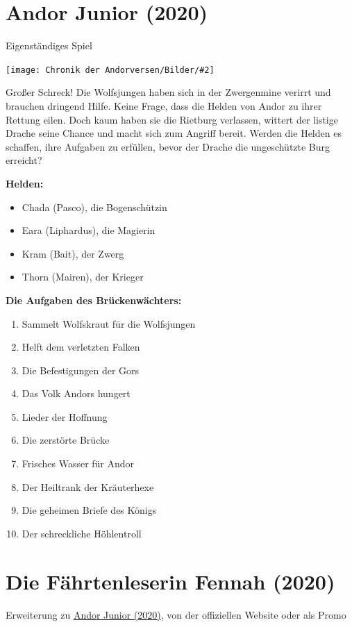 \documentclass[10pt, a4paper, oneside]{book}
\newcommand{\fillbreak}{\vspace*{\fill}\columnbreak}
\newcommand{\produkt}[1]{%
    \section{#1}%
    \label{Produkt: #1}%
}
\newcommand{\refprodukt}[1]{\hyperref[Produkt: #1]{#1}}
\newcommand{\bildmitts}[2][height=0.32\textwidth,width=0.48\textwidth,keepaspectratio]{%
    \begin{center}
        \texttt{[image: Chronik der Andorversen/Bilder/\#2]}
    \end{center}
}
\begin{document}
\begin{multicols}{2}
\fillbreak
\produkt{Andor Junior (2020)}

\begin{center}
    Eigenständiges Spiel
\end{center}


\bildmitts{Andor Junior (2020).png}

Großer Schreck! Die Wolfsjungen haben sich in der Zwergenmine verirrt und brauchen dringend Hilfe. Keine Frage, dass die Helden von Andor zu ihrer Rettung eilen. Doch kaum haben sie die Rietburg verlassen, wittert der listige Drache seine Chance und macht sich zum Angriff bereit. Werden die Helden es schaffen, ihre Aufgaben zu erfüllen, bevor der Drache die ungeschützte Burg erreicht?\bigskip

\textbf{Helden:}

\begin{itemize}[topsep=0pt,itemsep=-1ex,partopsep=1ex,parsep=1ex]
    \item Chada (Pasco), die Bogenschützin 
    \item Eara (Liphardus), die Magierin 
    \item Kram (Bait), der Zwerg 
    \item Thorn (Mairen), der Krieger 
\end{itemize}


\textbf{Die Aufgaben des Brückenwächters:}

\begin{enumerate}[topsep=0pt,itemsep=-1ex,partopsep=1ex,parsep=1ex]
    \setcounter{enumi}{0}
    \item Sammelt Wolfskraut für die Wolfsjungen
    \item Helft dem verletzten Falken
    \item Die Befestigungen der Gors
    \item Das Volk Andors hungert
    \item Lieder der Hoffnung
    \item Die zerstörte Brücke
    \item Frisches Wasser für Andor
    \item Der Heiltrank der Kräuterhexe
    \item Die geheimen Briefe des Königs
    \item Der schreckliche Höhlentroll
\end{enumerate}



\fillbreak
\produkt{Die Fährtenleserin Fennah (2020)}

\begin{center}
    Erweiterung zu \refprodukt{Andor Junior (2020)}, von der offiziellen Website oder als Promo
\end{center}


\end{multicols}
\end{document}
